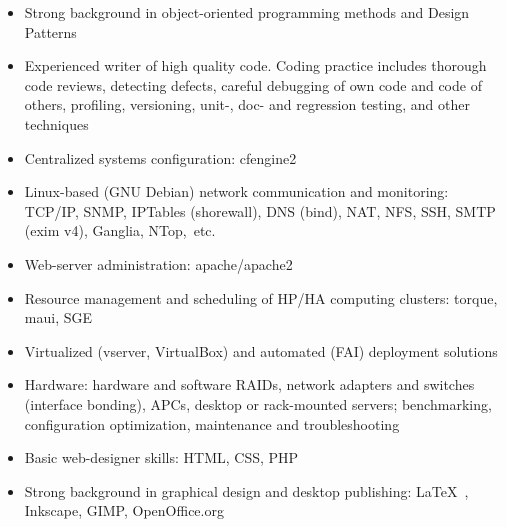 \documentclass[12pt,overlapped,line]{res}
\newcommand{\wdescription}[1]{({\small \textit{#1}})}
\begin{document}
\begin{resume}
\begin{description}[parsep=0.2em,leftmargin=1em]
\begin{itemize}
      \item Strong background in object-oriented programming methods
        and Design Patterns

      \item Experienced writer of high quality code. Coding practice
        includes thorough code reviews, detecting defects, careful
        debugging of own code and code of others, profiling,
        versioning, unit-, doc- and regression testing, and other techniques
      \end{itemize}

    \item[Administration:] \hspace*{\fill}
      \begin{itemize}

      \item Centralized systems configuration: cfengine2

      \item Linux-based (GNU Debian) network communication and
        monitoring: TCP/IP, SNMP, IPTables (shorewall), DNS (bind), NAT,
        NFS, SSH, SMTP (exim v4), Ganglia, NTop,\ etc.

      \item Web-server administration: apache/apache2


      \item Resource management and scheduling of HP/HA computing
        clusters: torque, maui, SGE

      \item Virtualized (vserver, VirtualBox) and automated (FAI)
        deployment solutions

      \item Hardware: hardware and software RAIDs, network adapters
        and switches (interface bonding), APCs, desktop or
        rack-mounted servers; benchmarking, configuration
        optimization, maintenance and troubleshooting

      \end{itemize}

    \item[Web Design and Others:]  \hspace*{\fill}
      \begin{itemize}
      \item Basic web-designer skills: HTML, CSS, PHP%
      \item Strong background in graphical design and desktop
        publishing: \LaTeX\ , Inkscape, GIMP, OpenOffice.org


\end{itemize}
\end{description}
\end{resume}
\end{document}
